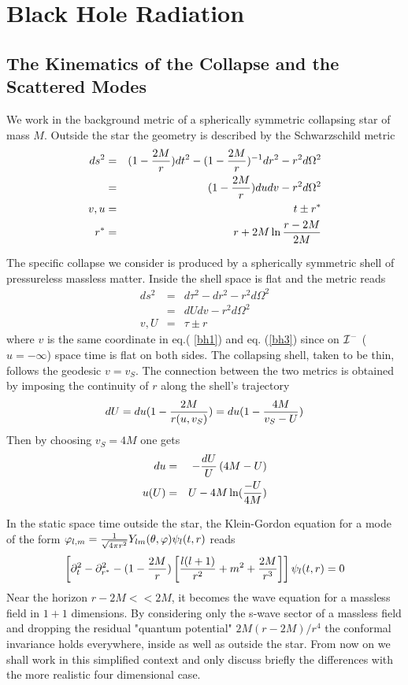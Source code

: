 \documentclass[12pt]{article}
\begin{document}
\section{Black Hole Radiation}
\subsection{The Kinematics of the Collapse and the Scattered Modes}


We work in the background metric of a spherically symmetric
collapsing
star of mass $M$. Outside the star the geometry is described  by the
Schwarzschild metric
\begin{eqnarray}
ds^2 &=& (1- {2 M \over r}) dt^2 - (1- {2 M
\over r})^{-1} dr^2 - r^2 d \Omega^2 \nonumber\\
&=& (1- {2 M \over r}) du dv -r^2 d \Omega^2 \nonumber\\
v,u &=& t \pm r^*\nonumber\\
r^* &=& r + 2M \ln{ r-2M \over 2M}
\label{bh1}
\end{eqnarray}

The specific  collapse we consider is
produced by a spherically symmetric shell of pressureless
massless matter. Inside the shell space is
flat and the metric reads
\begin{eqnarray}
ds^2 &=& d \tau ^2 - dr^2 - r^2 d \Omega^2 \nonumber\\
&=& dU dv -r^2 d \Omega^2 \nonumber\\
v,U &=& \tau \pm r
\label{bh3}
\end{eqnarray}
where $v$ is the same coordinate in eq.( \ref{bh1}) and eq. (\ref{bh3})
since on ${\cal I}^-$ ($u=-\infty$) space time is flat on both sides.
The collapsing shell, taken to be thin, follows the geodesic $v=v_S$.
The connection between the two metrics is obtained by imposing the
continuity of $r$ along the shell's trajectory
\begin{equation}
dU = du (1 - {2 M \over r(u,v_S)}) = du (1 - {4 M \over v_S - U})
\end{equation}
Then by choosing $v_S=4M$ one gets
\begin{eqnarray}
du &=& - { dU \over U} \left( 4M - U
\right)
\nonumber\\  u(U) &=& U - 4M \ln ({- U \over 4M})
\label{162s}
\end{eqnarray}

In the static space time outside the star, the Klein-Gordon equation
for a mode of the form $ \varphi_{l,m}
= {1 \over \sqrt {4 \pi r^2}} Y_{lm}(\theta, \varphi)
\psi_{l}(t,r)
$
reads
\begin{equation}
\left[ \partial_t^2 -\partial_{r^*}^2 - (1- {2 M \over
r}) \left[ {l(l+1) \over r^2} + m^2 + { 2 M \over r^3} \right] \right]
\psi_l
(t,r) =0
\label{bh2}
\end{equation}
Near the horizon $r-2M << 2M$, it  becomes the wave equation
for a massless field
in $1+1$
dimensions.
By considering
only
the s-wave sector of
a massless field
and dropping the
residual
 "quantum potential" ${2M(r-2M) / r^4}$ the
conformal invariance holds everywhere, inside as well as outside
the
star.
 From now  on we shall work in this simplified
context and only discuss
briefly the differences with the more realistic four dimensional case.
\end{document}
